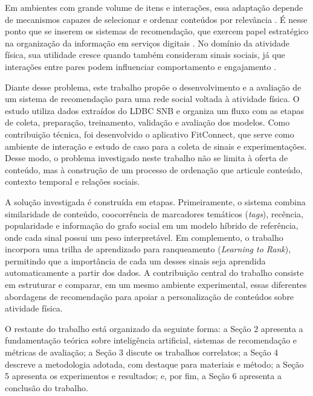 \documentclass[a4paper,12pt]{article}
\begin{document}
Em ambientes com grande volume de itens e interações, essa adaptação depende de mecanismos capazes de selecionar e ordenar conteúdos por relevância \cite{10.1145/3285029}. É nesse ponto que se inserem os sistemas de recomendação, que exercem papel estratégico na organização da informação em serviços digitais \cite{GomezUribe2016Netflix}. No domínio da atividade física, sua utilidade cresce quando também consideram sinais sociais, já que interações entre pares podem influenciar comportamento e engajamento \cite{Franken2023}.

Diante desse problema, este trabalho propõe o desenvolvimento e a avaliação de um sistema de recomendação para uma rede social voltada à atividade física. O estudo utiliza dados extraídos do LDBC SNB \cite{Angles2020LDBCSNB} e organiza um fluxo com as etapas de coleta, preparação, treinamento, validação e avaliação dos modelos. Como contribuição técnica, foi desenvolvido o aplicativo FitConnect, que serve como ambiente de interação e estudo de caso para a coleta de sinais e experimentações. Desse modo, o problema investigado neste trabalho não se limita à oferta de conteúdo, mas à construção de um processo de ordenação que articule conteúdo, contexto temporal e relações sociais.

A solução investigada é construída em etapas. Primeiramente, o sistema combina similaridade de conteúdo, coocorrência de marcadores temáticos (\textit{tags}), recência, popularidade e informação do grafo social em um modelo híbrido de referência, onde cada sinal possui um peso interpretável. Em complemento, o trabalho incorpora uma trilha de aprendizado para ranqueamento (\textit{Learning to Rank}), permitindo que a importância de cada um desses sinais seja aprendida automaticamente a partir dos dados. A contribuição central do trabalho consiste em estruturar e comparar, em um mesmo ambiente experimental, essas diferentes abordagens de recomendação para apoiar a personalização de conteúdos sobre atividade física.

O restante do trabalho está organizado da seguinte forma: a Seção 2 apresenta a fundamentação teórica sobre inteligência artificial, sistemas de recomendação e métricas de avaliação; a Seção 3 discute os trabalhos correlatos; a Seção 4 descreve a metodologia adotada, com destaque para materiais e método; a Seção 5 apresenta os experimentos e resultados; e, por fim, a Seção 6 apresenta a conclusão do trabalho.
\end{document}
